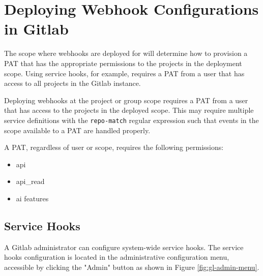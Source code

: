 

\section{Deploying Webhook Configurations in Gitlab}

The scope where webhooks are deployed for \cxoneflow will determine how to provision a PAT
that has the appropriate permissions to the projects in the deployment scope.  Using service
hooks, for example, requires a PAT from a user that has access to all projects in the Gitlab
instance.

Deploying webhooks at the project or group scope requires a PAT from a user that has access
to the projects in the deployed scope.  This may require multiple \cxoneflow service definitions
with the \texttt{repo-match} regular expression such that events in the scope available to a
PAT are handled properly.

A PAT, regardless of user or scope, requires the following permissions:

\begin{itemize}
  \item api
  \item api\_read
  \item ai features
\end{itemize}

\subsection{Service Hooks}

A Gitlab administrator can configure system-wide service hooks.  The service hooks configuration is located in the
administrative configuration menu, accessible by clicking the "Admin" button as shown in Figure \ref{fig:gl-admin-menu}.

